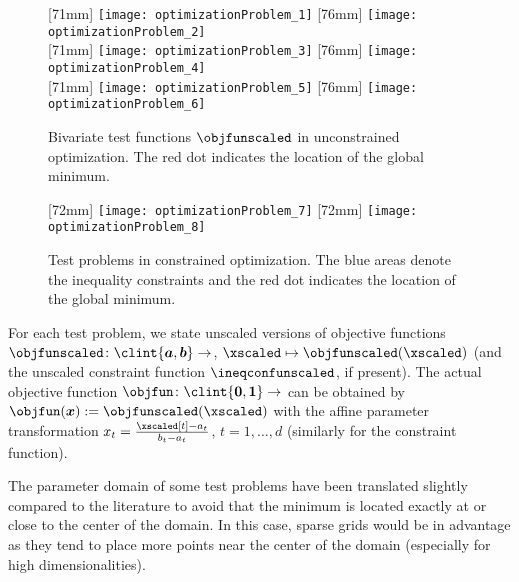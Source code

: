 \begin{figure}
  [71mm]{%
    \texttt{[image: optimizationProblem\_1]}%
  }%
  \hfill%
  [76mm]{%
    \texttt{[image: optimizationProblem\_2]}%
  }\\[2.5mm]%
  [71mm]{%
    \texttt{[image: optimizationProblem\_3]}%
  }%
  \hfill%
  [76mm]{%
    \texttt{[image: optimizationProblem\_4]}%
  }\\[2.5mm]%
  [71mm]{%
    \texttt{[image: optimizationProblem\_5]}%
  }%
  \hfill%
  [76mm]{%
    \texttt{[image: optimizationProblem\_6]}%
  }%
  \caption[%
    Unconstrained test problems%
  ]{%
    Bivariate test functions $\objfunscaled$ in unconstrained optimization.
    The \textcolor{C1}{red dot} indicates the location of the
    global minimum.%
  }%
  \label{fig:unconstrainedOptimizationProblem}%
\end{figure}

\begin{figure}
  [72mm]{%
    \texttt{[image: optimizationProblem\_7]}%
  }%
  \hfill%
  [72mm]{%
    \texttt{[image: optimizationProblem\_8]}%
  }%
  \caption[%
    Constrained test problems%
  ]{%
    Test problems in constrained optimization.
    The \textcolor{C0}{blue areas} denote the inequality constraints and
    the \textcolor{C1}{red dot} indicates the location of the
    global minimum.%
  }%
  \label{fig:constrainedOptimizationProblem}%
\end{figure}

For each test problem, we state unscaled versions of objective functions
$\objfunscaled\colon \clint{\*a, \*b} \to \real$,
$\xscaled \mapsto \objfunscaled(\xscaled)$
(and the unscaled constraint function $\ineqconfunscaled$, if present).
The actual objective function $\objfun\colon \clint{\*0, \*1} \to \real$
can be obtained by $\objfun(\*x) := \objfunscaled(\xscaled)$
with the affine parameter transformation
$x_t = \tfrac{\xscaled[t] - a_t}{b_t - a_t}$, $t = 1, \dotsc, d$
(similarly for the constraint function).

The parameter domain of some test problems have been translated slightly
compared to the literature
to avoid that the minimum is located exactly at or close to
the center of the domain.
In this case, sparse grids would be in advantage as
they tend to place more points near the center of the domain
(especially for high dimensionalities).
